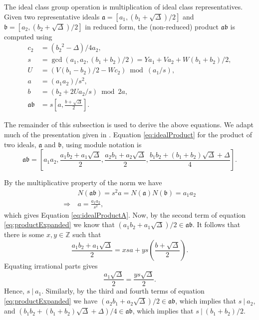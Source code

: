 \documentclass{ucalgthes1}
\theoremstyle{definition}
\newcommand{\ZZ}{\mathbb{Z}}
\newcommand{\ideal}{\mathfrak}
\begin{document}
The ideal class group operation is multiplication of ideal class representatives. Given two representative ideals $\mathfrak a = [a_1, (b_1 + \sqrt{\Delta})/2]$ and $\mathfrak b = [a_2, (b_2 + \sqrt{\Delta})/2]$ in reduced form, the (non-reduced) product $\mathfrak a \mathfrak b$ is computed using
\begin{align}
	c_2 & = ({b_2}^2-\Delta)/4a_2, \nonumber \\
	s & = \gcd(a_1, a_2, (b_1+b_2)/2) = Ya_1 + Va_2 + W(b_1+b_2)/2,    \label{eq:idealProductS} \\
	U & = (V(b_1-b_2)/2 - Wc_2) \bmod{(a_1/s)},                        \label{eq:idealProductU} \\
	a & = (a_1a_2)/s^2,                                                \label{eq:idealProductA} \\
	b & = (b_2 + 2Ua_2/s) \bmod{2a},                                   \label{eq:idealProductB} \\
	\mathfrak a \mathfrak b & = s\left[a, \frac{b + \sqrt{\Delta}}{2}\right]. \nonumber
\end{align}

The remainder of this subsection is used to derive the above equations.  We adapt much of the presentation given in \cite[pp.117--118]{Jacobson2009}. Equation \ref{eq:idealProduct} for the product of two ideals, $\ideal a$ and $\ideal b$, using module notation is
\begin{equation}
\label{eq:productExpanded}
\mathfrak{a} \mathfrak{b} =
\left[ a_1a_2, \frac{a_1b_2 + a_1\sqrt{\Delta}}{2}, \frac{a_2b_1 + a_2\sqrt{\Delta}}{2}, \frac{b_1b_2 + (b_1+b_2)\sqrt{\Delta} + \Delta}{4} \right].
\end{equation}

\noindent
By the multiplicative property of the norm we have
\begin{align*}
	& N(\mathfrak{a}\mathfrak{b}) = s^2a = N(\mathfrak{a})N(\mathfrak{b}) = a_1 a_2 \\
	\Rightarrow~ & a = \frac{a_1a_2}{s^2},
\end{align*}
which gives Equation \ref{eq:idealProductA}. Now, by the second term of equation \eqref{eq:productExpanded} we know that $(a_1b_2 + a_1\sqrt{\Delta})/2 \in \mathfrak{a}\mathfrak{b}$.  It follows that there is some $x,y \in \ZZ$ such that
\[
	\frac{a_1b_2 + a_1\sqrt{\Delta}}{2} = xsa + ys\left(\frac{b+\sqrt{\Delta}}{2}\right).
\]
Equating irrational parts gives
\begin{equation*}
	\frac{a_1\sqrt{\Delta}}{2} = \frac{ys\sqrt{\Delta}}{2}.
\end{equation*}
\noindent
Hence, $s ~|~ a_1$.  Similarly, by the third and fourth terms of equation \eqref{eq:productExpanded} we have $(a_2b_1+a_2\sqrt{\Delta})/2 \in \mathfrak{a}\mathfrak{b}$, which implies that $s~|~a_2$, and $(b_1b_2 + (b_1+b_2)\sqrt{\Delta} + \Delta)/4 \in \mathfrak{a}\mathfrak{b}$, which implies that $s~|~(b_1+b_2)/2$. 
\end{document}
